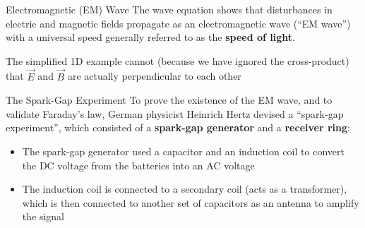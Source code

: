 \documentclass[12pt,aspectratio=169]{beamer}
\begin{document}
\begin{frame}{Electromagnetic (EM) Wave}
  The wave equation shows that disturbances in electric and magnetic fields
  propagate as an electromagnetic wave (``EM wave'') with a universal speed
  generally referred to as the \textbf{speed of light}.


  The simplified 1D example cannot (because we have ignored the cross-product)
  that $\vec E$ and $\vec B$ are actually perpendicular to each other
\end{frame}



\begin{frame}{The Spark-Gap Experiment}
  To prove the existence of the EM wave, and to validate Faraday's law,
  German physicist Heinrich Hertz devised a ``spark-gap experiment'', which
  consisted of a \textbf{spark-gap generator} and a \textbf{receiver ring}:
  \begin{center}
  \end{center}
  \begin{itemize}
  \item\vspace{-.07in}The spark-gap generator used a capacitor and an induction
    coil to convert the DC voltage from the batteries into an AC voltage
  \item The induction coil is connected to a secondary coil (acts as a
    transformer), which is then connected to another set of capacitors as an
    antenna to amplify the signal
  \end{itemize}
\end{frame}
\end{document}
